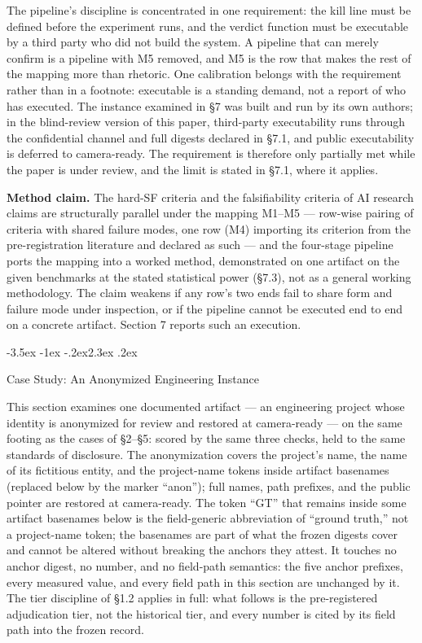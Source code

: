 \documentclass[11pt,a4paper]{article}
\makeatletter
\renewcommand\section{\@startsection{section}{1}{\z@}%
  {-3.5ex \@plus -1ex \@minus -.2ex}{2.3ex \@plus .2ex}%
  {\normalfont\Large\bfseries\raggedright}}
\makeatother
\begin{document}
The pipeline's discipline is concentrated in one requirement: the kill line must be defined before the experiment runs, and the verdict function must be executable by a third party who did not build the system. A pipeline that can merely confirm is a pipeline with M5 removed, and M5 is the row that makes the rest of the mapping more than rhetoric. One calibration belongs with the requirement rather than in a footnote: executable is a standing demand, not a report of who has executed. The instance examined in §7 was built and run by its own authors; in the blind-review version of this paper, third-party executability runs through the confidential channel and full digests declared in §7.1, and public executability is deferred to camera-ready. The requirement is therefore only partially met while the paper is under review, and the limit is stated in §7.1, where it applies.

\textbf{Method claim.} The hard-SF criteria and the falsifiability criteria of AI research claims are structurally parallel under the mapping M1–M5 — row-wise pairing of criteria with shared failure modes, one row (M4) importing its criterion from the pre-registration literature and declared as such — and the four-stage pipeline ports the mapping into a worked method, demonstrated on one artifact on the given benchmarks at the stated statistical power (§7.3), not as a general working methodology. The claim weakens if any row's two ends fail to share form and failure mode under inspection, or if the pipeline cannot be executed end to end on a concrete artifact. Section 7 reports such an execution.

\section{Case Study: An Anonymized Engineering Instance}

This section examines one documented artifact — an engineering project whose identity is anonymized for review and restored at camera-ready — on the same footing as the cases of §2–§5: scored by the same three checks, held to the same standards of disclosure. The anonymization covers the project's name, the name of its fictitious entity, and the project-name tokens inside artifact basenames (replaced below by the marker ``anon''); full names, path prefixes, and the public pointer are restored at camera-ready. The token ``GT'' that remains inside some artifact basenames below is the field-generic abbreviation of ``ground truth,'' not a project-name token; the basenames are part of what the frozen digests cover and cannot be altered without breaking the anchors they attest. It touches no anchor digest, no number, and no field-path semantics: the five anchor prefixes, every measured value, and every field path in this section are unchanged by it. The tier discipline of §1.2 applies in full: what follows is the pre-registered adjudication tier, not the historical tier, and every number is cited by its field path into the frozen record.
\end{document}
